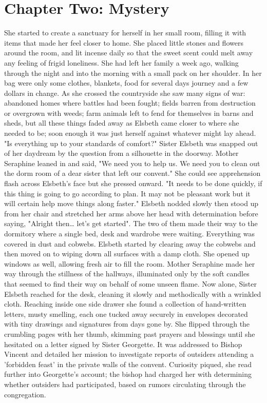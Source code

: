 \documentclass[11pt]{article}
\begin{document}
\section{Chapter Two: Mystery}
\label{sec:org5aed5f3}
She started to create a sanctuary for herself in her small room, filling it with items that made her feel closer to home. She placed little stones and flowers around the room, and lit incense daily so that the sweet scent could melt away any feeling of frigid loneliness. She had left her family a week ago, walking through the night and into the morning with a small pack on her shoulder. In her bag were only some clothes, blankets, food for several days journey and a few dollars in change. As she crossed the countryside she saw many signs of war: abandoned homes where battles had been fought; fields barren from destruction or overgrown with weeds; farm animals left to fend for themselves in barns and sheds, but all these things faded away as Elsbeth came closer to where she needed to be; soon enough it was just herself against whatever might lay ahead.
"Is everything up to your standards of comfort?" Sister Elsbeth was snapped out of her daydream by the question from a silhouette in the doorway.
Mother Seraphine leaned in and said, "We need you to help us. We need you to clean out the dorm room of a dear sister that left our convent." She could see apprehension flash across Elsbeth's face but she pressed onward. "It needs to be done quickly, if this thing is going to go according to plan. It may not be pleasant work but it will certain help move things along faster."
Elsbeth nodded slowly then stood up from her chair and stretched her arms above her head with determination before saying, "Alright then\ldots{} let's get started". The two of them made their way to the dormitory where a single bed, desk and wardrobe were waiting. Everything was covered in dust and cobwebs. Elsbeth started by clearing away the cobwebs and then moved on to wiping down all surfaces with a damp cloth. She opened up windows as well, allowing fresh air to fill the room. Mother Seraphine made her way through the stillness of the hallways, illuminated only by the soft candles that seemed to find their way on behalf of some unseen flame.
Now alone, Sister Elsbeth reached for the desk, cleaning it slowly and methodically with a wrinkled cloth. Reaching inside one side drawer she found a collection of hand-written letters, musty smelling, each one tucked away securely in envelopes decorated with tiny drawings and signatures from days gone by. She flipped through the crumbling pages with her thumb, skimming past prayers and blessings until she hesitated on a letter signed by Sister Georgette. It was addressed to Bishop Vincent and detailed her mission to investigate reports of outsiders attending a 'forbidden feast' in the private walls of the convent. Curiosity piqued, she read further into Georgette's account; the bishop had charged her with determining whether outsiders had participated, based on rumors circulating through the congregation.
\end{document}
